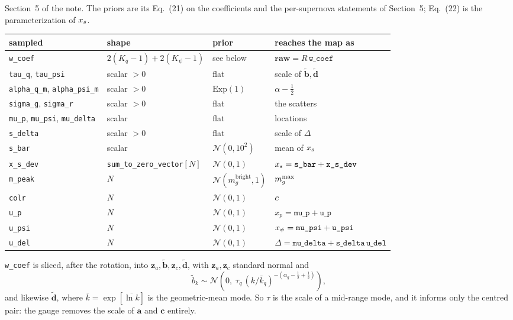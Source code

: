 \documentclass[11pt]{article}
\newcommand{\code}[1]{\texttt{#1}}
\begin{document}
Section~5 of the note. The priors are its Eq.~(21) on the coefficients and the per-supernova
statements of Section~5; Eq.~(22) is the parameterization of $x_{s}$.

\begin{tabular}{llll}
\toprule
sampled & shape & prior & reaches the map as \\
\midrule
\code{w\_coef}      & $2(K_{q}{-}1) + 2(K_{\psi}{-}1)$ & see below & $\mathbf{raw} = R\,\code{w\_coef}$ \\
\code{tau\_q}, \code{tau\_psi}       & scalar $>0$ & flat & scale of $\tilde{\mathbf{b}}, \tilde{\mathbf{d}}$ \\
\code{alpha\_q\_m}, \code{alpha\_psi\_m} & scalar $>0$ & $\mathrm{Exp}(1)$ & $\alpha - \frac12$ \\
\code{sigma\_g}, \code{sigma\_r}     & scalar $>0$ & flat & the scatters \\
\code{mu\_p}, \code{mu\_psi}, \code{mu\_delta} & scalar & flat & locations \\
\code{s\_delta}     & scalar $>0$ & flat & scale of $\Delta$ \\
\code{s\_bar}       & scalar & $\mathcal{N}(0, 10^{2})$ & mean of $x_{s}$ \\
\code{x\_s\_dev}    & \code{sum\_to\_zero\_vector}$[N]$ & $\mathcal{N}(0,1)$ & $\xstretch = \code{s\_bar} + \code{x\_s\_dev}$ \\
\code{m\_peak}      & $N$ & $\mathcal{N}(m_{g}^{\mathrm{bright}}, 1)$ & $m_{g}^{\max}$ \\
\code{colr}         & $N$ & $\mathcal{N}(0,1)$ & $c$ \\
\code{u\_p}         & $N$ & $\mathcal{N}(0,1)$ & $x_p = \code{mu\_p} + \code{u\_p}$ \\
\code{u\_psi}       & $N$ & $\mathcal{N}(0,1)$ & $\shapeturn = \code{mu\_psi} + \code{u\_psi}$ \\
\code{u\_del}       & $N$ & $\mathcal{N}(0,1)$ & $\Delta = \code{mu\_delta} + \code{s\_delta}\,\code{u\_del}$ \\
\bottomrule
\end{tabular}

\medskip\noindent
\code{w\_coef} is sliced, after the rotation, into
$\mathbf{z}_{a}, \tilde{\mathbf{b}}, \mathbf{z}_{c}, \tilde{\mathbf{d}}$, with
$\mathbf{z}_{a}, \mathbf{z}_{c}$ standard normal and
\begin{equation}
  \tilde b_{k} \sim \mathcal{N}\!\left(0,\;
    \tau_{q}\,(k/\bar k_{q})^{-(\alpha_{q}-\frac12+\frac12)}\right) ,
\end{equation}
and likewise $\tilde{\mathbf{d}}$, where $\bar k = \exp[\overline{\ln k}]$ is the
geometric-mean mode. So $\tau$ is the scale of a mid-range mode, and it informs only the
centred pair: the gauge removes the scale of $\mathbf{a}$ and $\mathbf{c}$ entirely.
\end{document}
